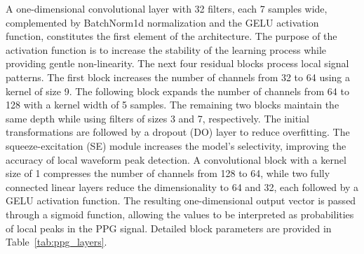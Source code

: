 \documentclass{citask}
\begin{document}
A one-dimensional convolutional layer with 32 filters, each 7 samples wide, complemented by BatchNorm1d normalization and the GELU activation function, constitutes the first element of the architecture. The purpose of the activation function is to increase the stability of the learning process while providing gentle non-linearity. The next four residual blocks process local signal patterns. The first block increases the number of channels from 32 to 64 using a kernel of size 9. The following block expands the number of channels from 64 to 128 with a kernel width of 5 samples. The remaining two blocks maintain the same depth while using filters of sizes 3 and 7, respectively. The initial transformations are followed by a dropout (DO) layer to reduce overfitting.
The squeeze-excitation (SE) module increases the model’s selectivity, improving the accuracy of local waveform peak detection. A convolutional block with a kernel size of 1 compresses the number of channels from 128 to 64, while two fully connected linear layers reduce the dimensionality to 64 and 32, each followed by a GELU activation function. The resulting one-dimensional output vector is passed through a sigmoid function, allowing the values to be interpreted as probabilities of local peaks in the PPG signal. Detailed block parameters are provided in Table~\ref{tab:ppg_layers}.

\begin{table}[ht]
\centering
\caption{Convolutional network's block parameters}
\label{tab:ppg_layers}
\end{table}
\end{document}
